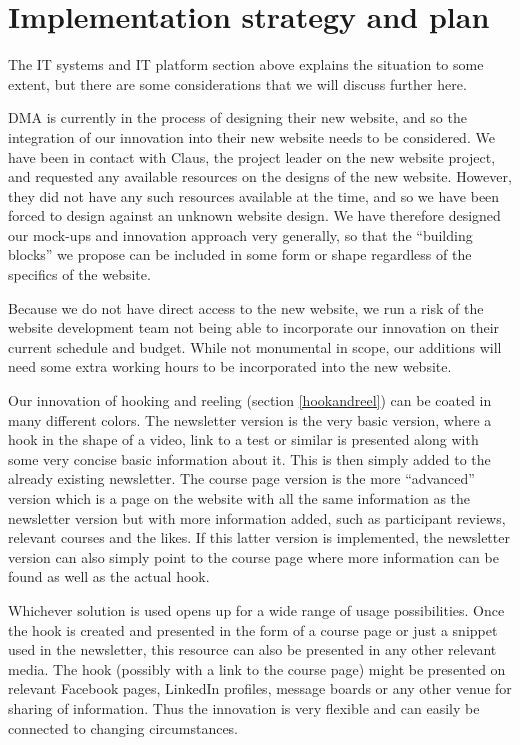 \section{Implementation strategy and plan}
\label{sec:implementation}
The IT systems and IT platform section above explains the situation to some extent, but there are some considerations that we will discuss further here.

DMA is currently in the process of designing their new website, and so the integration of our innovation into their new website needs to be considered. We have been in contact with Claus, the project leader on the new website project, and requested any available resources on the designs of the new website. However, they did not have any such resources available at the time, and so we have been forced to design against an unknown website design. We have therefore designed our mock-ups and innovation approach very generally, so that the “building blocks” we propose can be included in some form or shape regardless of the specifics of the website.

Because we do not have direct access to the new website, we run a risk of the website development team not being able to incorporate our innovation on their current schedule and budget. While not monumental in scope, our additions will need some extra working hours to be incorporated into the new website.

Our innovation of hooking and reeling (section \ref{hookandreel}) can be coated in many different colors. The newsletter version is the very basic version, where a hook in the shape of a video, link to a test or similar is presented along with some very concise basic information about it. This is then simply added to the already existing newsletter. The course page version is the more “advanced” version which is a page on the website with all the same information as the newsletter version but with more information added, such as participant reviews, relevant courses and the likes. If this latter version is implemented, the newsletter version can also simply point to the course page where more information can be found as well as the actual hook.

Whichever solution is used opens up for a wide range of usage possibilities. Once the hook is created and presented in the form of a course page or just a snippet used in the newsletter, this resource can also be presented in any other relevant media. The hook (possibly with a link to the course page) might be presented on relevant Facebook pages, LinkedIn profiles, message boards or any other venue for sharing of information. Thus the innovation is very flexible and can easily be connected to changing circumstances.

